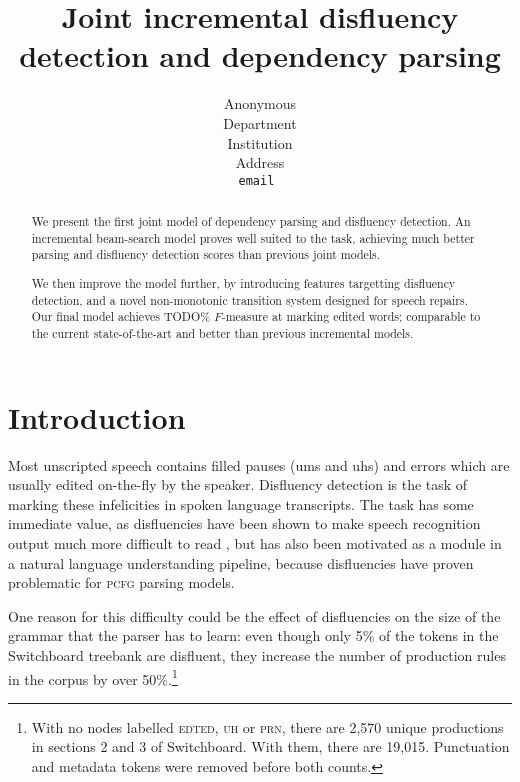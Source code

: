 \documentclass[11pt,letterpaper]{article}
\title{Joint incremental disfluency detection and dependency parsing}
\author{
	Anonymous\\
  	Department\\
  	Institution\\
  	Address\\
  {\tt \small email }\\
}
\date{}
\newcommand{\pcfg}{\textsc{pcfg}\xspace}
\begin{document}
\maketitle
\begin{abstract}

    We present the first joint model of dependency parsing and
    disfluency detection. An incremental beam-search model
    proves well suited to the task, achieving much better parsing and
    disfluency detection scores than previous joint models.

We then improve the model further, by introducing features targetting disfluency
detection, and a novel non-monotonic transition system designed for speech repairs.
Our final model achieves TODO\% $F$-measure at marking edited words; comparable
to the current state-of-the-art and better than previous incremental models.

\end{abstract}

\section{Introduction}

Most unscripted speech contains filled pauses (ums and uhs) and errors which are
usually edited on-the-fly by the speaker. Disfluency detection is the task of
marking these infelicities in spoken language transcripts. The task has some
immediate value, as disfluencies have been shown to make speech recognition output
much more difficult to read \citep{jones:03}, but has also been motivated as
a module in a natural language understanding pipeline, because disfluencies have
proven problematic for \pcfg parsing models.

One reason for this difficulty could be the effect of disfluencies on the size
of the grammar that the parser has to learn: even though only 5\% of the tokens
in the Switchboard treebank \citep{marcus:93} are disfluent, they increase
the number of production rules in the corpus by over 50\%.\footnote{With
no nodes labelled \textsc{edted}, \textsc{uh} or \textsc{prn}, there are
2,570 unique productions in sections 2 and 3 of Switchboard. With them,
there are 19,015. Punctuation and metadata tokens were removed before both counts.}

\end{document}

